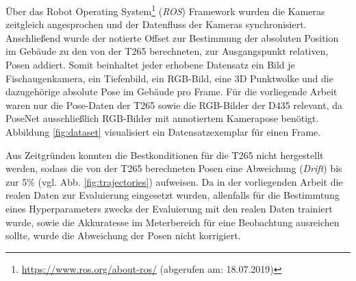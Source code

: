Über das Robot Operating System\footnote{\url{https://www.ros.org/about-ros/} (abgerufen am: 18.07.2019)} (\textit{ROS}) Framework wurden die Kameras zeitgleich angesprochen und der Datenfluss der Kameras synchronisiert. Anschließend wurde der notierte Offset zur Bestimmung der absoluten Position im Gebäude zu den von der T265 berechneten, zur Ausgangspunkt relativen, Posen addiert. Somit beinhaltet jeder erhobene Datensatz ein Bild je Fischaugenkamera, ein Tiefenbild, ein RGB-Bild, eine 3D Punktwolke und die dazugehörige absolute Pose im Gebäude pro Frame. Für die vorliegende Arbeit waren nur die Pose-Daten der T265 sowie die RGB-Bilder der D435 relevant, da PoseNet ausschließlich RGB-Bilder mit annotiertem Kamerapose benötigt. Abbildung \ref{fig:dataset} visualisiert ein Datensatzexemplar für einen Frame.

Aus Zeitgründen konnten die Bestkonditionen für die T265 nicht hergestellt werden, sodass die von der T265 berechneten Posen eine Abweichung (\textit{Drift}) bis zur 5\% (vgl. Abb. \ref{fig:trajectories}) aufweisen. Da in der vorliegenden Arbeit die realen Daten zur Evaluierung eingesetzt wurden, allenfalls für die Bestimmtung eines Hyperparameters zwecks der Evaluierung mit den realen Daten trainiert wurde, sowie die Akkuratesse im Meterbereich für eine Beobachtung ausreichen sollte, wurde die Abweichung der Posen nicht korrigiert.


